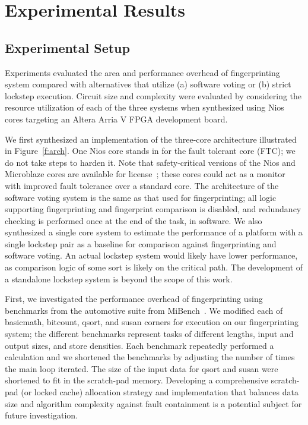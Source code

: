 
\chapter{Experimental Results} %

\label{Chapter5} %




\section{Experimental Setup}

	Experiments evaluated the area and performance overhead of fingerprinting system compared with alternatives that utilize (a) software voting or (b) strict lockstep execution.
	Circuit size and complexity were evaluated by considering the resource utilization of each of the three systems when synthesized using Nios cores targeting an Altera Arria V FPGA development board.
	
	We first synthesized an implementation of the three-core architecture illustrated in Figure~\ref{f:arch}.
	One Nios core stands in for the fault tolerant core (FTC);
		we do not take steps to harden it.
	Note that safety-critical versions of the Nios and Microblaze cores are available for license~\cite{alteraniossc}\cite{xilinx_lockstep};
		these cores could act as a monitor with improved fault tolerance over a standard core.
	The architecture of the software voting system is the same as that used for fingerprinting;
		all logic supporting fingerprinting and fingerprint comparison is disabled, and redundancy checking is performed once at the end of the task, in software.
	We also synthesized a single core system to estimate the performance of a platform with a single lockstep pair as a baseline for comparison against fingerprinting and software voting.
	An actual lockstep system would likely have lower performance, as comparison logic of some sort is likely on the critical path.
	The development of a standalone lockstep system is beyond the scope of this work.
	
	First, we investigated the performance overhead of fingerprinting using benchmarks from the automotive suite from MiBench~\cite{guthaus2001mibench}.
	We modified each of basicmath, bitcount, qsort, and susan corners for execution on our fingerprinting system;
		the different benchmarks represent tasks of different lengths, input and output sizes, and store densities.
	Each benchmark repeatedly performed a calculation and we shortened the benchmarks by adjusting the number of times the main loop iterated.
	The size of the input data for qsort and susan were shortened to fit in the scratch-pad memory.
	Developing a comprehensive scratch-pad (or locked cache) allocation strategy and implementation that balances data size and algorithm complexity against fault containment is a potential subject for future investigation.
	
